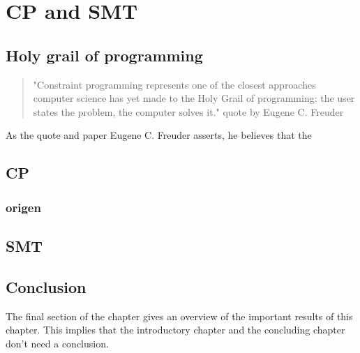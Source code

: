 \chapter{CP and SMT}
\label{cha:4}


\section{Holy grail of programming}
\begin{quote}
	"Constraint programming represents one of the closest approaches computer science has yet made to the Holy Grail of programming: the user states the problem, the computer solves it." \cite{11freuder1997pursuitHolyGrail} quote by Eugene C. Freuder
\end{quote}
As the quote and paper Eugene C. Freuder asserts, he believes that the 

\section{CP}

\subsection{origen}

\section{SMT}


\section{Conclusion}
The final section of the chapter gives an overview of the important results
of this chapter. This implies that the introductory chapter and the
concluding chapter don't need a conclusion.

